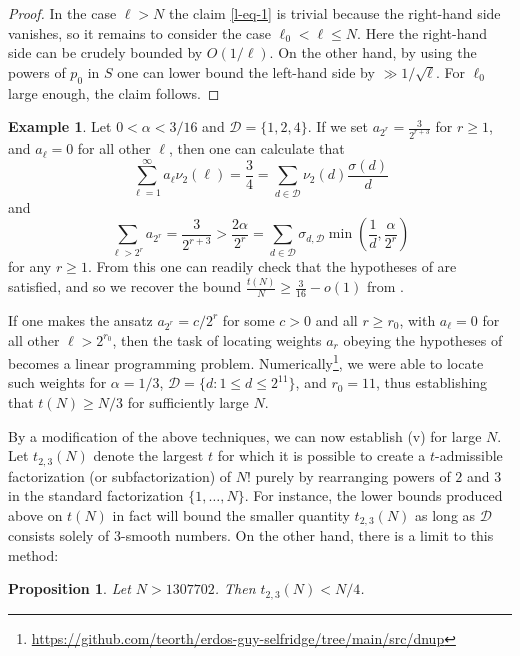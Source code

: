 \documentclass[12pt,a4paper,reqno]{amsart}
\numberwithin{equation}{section}
\theoremstyle{plain}
\newtheorem{proposition}[theorem]{Proposition}
\theoremstyle{definition}
\newtheorem{example}[theorem]{Example}
\begin{document}
\begin{proof}
In the case $\ell>N$ the claim \eqref{l-eq-1} is trivial because the right-hand side vanishes, so it remains to consider the case $\ell_0 < \ell \leq N$. Here the right-hand side can be crudely bounded by $O(1/\ell)$.  On the other hand, by using the powers of $p_0$ in $S$ one can lower bound the left-hand side by $\gg 1/\sqrt{\ell}$.  For $\ell_0$ large enough, the claim follows.
\end{proof}

\begin{example}  Let $0 < \alpha < 3/16$ and ${\mathcal D} = \{1,2,4\}$.  If we set $a_{2^r} = \frac{3}{2^{r+3}}$ for $r \geq 1$, and $a_\ell=0$ for all other $\ell$, then one can calculate that
$$ \sum_{\ell=1}^\infty a_\ell \nu_2(\ell) = \frac{3}{4} = \sum_{d \in {\mathcal D}} \nu_2(d) \frac{\sigma(d)}{d}$$
and
$$ \sum_{\ell > 2^r} a_{2^r} = \frac{3}{2^{r+3}} > \frac{2\alpha}{2^r} = \sum_{d \in {\mathcal D}} \sigma_{d,{\mathcal D}} \min\left( \frac{1}{d}, \frac{\alpha}{2^r} \right)$$
for any $r \geq 1$.  From this one can readily check that the hypotheses of  are satisfied, and so we recover the bound $\frac{t(N)}{N} \geq \frac{3}{16}-o(1)$ from \cite{guy}.
\end{example}

If one makes the ansatz $a_{2^r} = c / 2^r$ for some $c>0$ and all $r \geq r_0$, with $a_\ell = 0$ for all other $\ell > 2^{r_0}$, then the task of locating weights $a_r$ obeying the hypotheses of  becomes a linear programming problem.  
Numerically\footnote{\url{https://github.com/teorth/erdos-guy-selfridge/tree/main/src/dnup}}, we were able to locate such weights for $\alpha=1/3$, ${\mathcal D} = \{d: 1 \leq d \leq 2^{11}\}$, and $r_0=11$, thus establishing that $t(N) \geq N/3$ for sufficiently large $N$.

By a modification of the above techniques, we can now establish (v) for large $N$.  Let $t_{2,3}(N)$ denote the largest $t$ for which it is possible to create a $t$-admissible factorization (or subfactorization) of $N!$ purely by rearranging powers of $2$ and $3$ in the standard factorization $\{1,\dots,N\}$.  For instance, the lower bounds produced above on $t(N)$ in fact will bound the smaller quantity $t_{2,3}(N)$ as long as ${\mathcal D}$ consists solely of $3$-smooth numbers. On the other hand, there is a limit to this method:

\begin{proposition}  Let $N > 1307702$.  Then $t_{2,3}(N) < N/4$.
\end{proposition}
\end{document}

